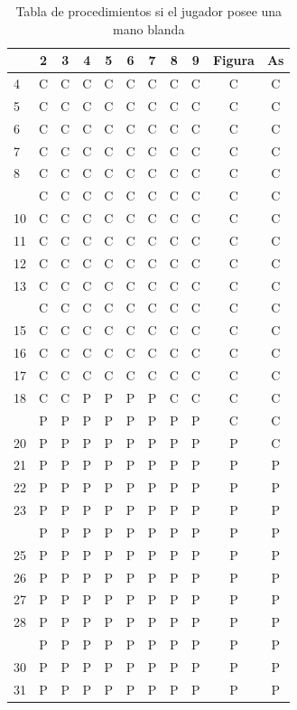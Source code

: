 \documentclass[12pt,a4paper,]{book}
\numberwithin{dummy}{section}
\theoremstyle{ocrenumbox}
\theoremstyle{blacknumex}
\theoremstyle{blacknumbox}
\theoremstyle{ocrenum}
\theoremstyle{ocrenum}
\begin{document}
\begin{longtable}[t]{lcccccccccc}
\caption{\label{tab:unnamed-chunk-40}Tabla de procedimientos si el jugador posee una mano blanda}\\
\toprule
 & 2 & 3 & 4 & 5 & 6 & 7 & 8 & 9 & Figura & As\\
\midrule
4 & C & C & C & C & C & C & C & C & C & C\\
5 & C & C & C & C & C & C & C & C & C & C\\
6 & C & C & C & C & C & C & C & C & C & C\\
7 & C & C & C & C & C & C & C & C & C & C\\
8 & C & C & C & C & C & C & C & C & C & C\\
\addlinespace
9 & C & C & C & C & C & C & C & C & C & C\\
10 & C & C & C & C & C & C & C & C & C & C\\
11 & C & C & C & C & C & C & C & C & C & C\\
12 & C & C & C & C & C & C & C & C & C & C\\
13 & C & C & C & C & C & C & C & C & C & C\\
\addlinespace
14 & C & C & C & C & C & C & C & C & C & C\\
15 & C & C & C & C & C & C & C & C & C & C\\
16 & C & C & C & C & C & C & C & C & C & C\\
17 & C & C & C & C & C & C & C & C & C & C\\
18 & C & C & P & P & P & P & C & C & C & C\\
\addlinespace
19 & P & P & P & P & P & P & P & P & C & C\\
20 & P & P & P & P & P & P & P & P & P & C\\
21 & P & P & P & P & P & P & P & P & P & P\\
22 & P & P & P & P & P & P & P & P & P & P\\
23 & P & P & P & P & P & P & P & P & P & P\\
\addlinespace
24 & P & P & P & P & P & P & P & P & P & P\\
25 & P & P & P & P & P & P & P & P & P & P\\
26 & P & P & P & P & P & P & P & P & P & P\\
27 & P & P & P & P & P & P & P & P & P & P\\
28 & P & P & P & P & P & P & P & P & P & P\\
\addlinespace
29 & P & P & P & P & P & P & P & P & P & P\\
30 & P & P & P & P & P & P & P & P & P & P\\
31 & P & P & P & P & P & P & P & P & P & P\\
\bottomrule
\end{longtable}
\endgroup{}
\end{document}
